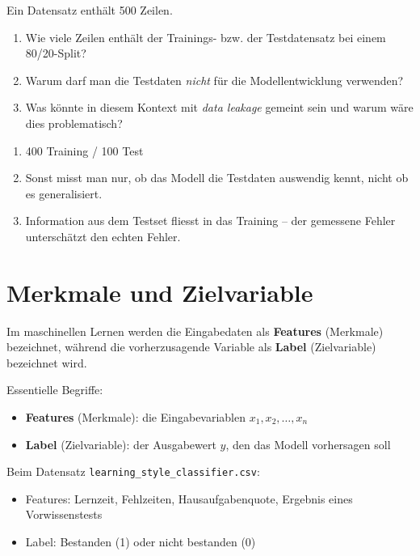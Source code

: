 \begin{myexercise}
    Ein Datensatz enthält 500 Zeilen.
    \begin{enumerate}
        \item Wie viele Zeilen enthält der Trainings- bzw. der Testdatensatz bei einem 80/20-Split?
        \item Warum darf man die Testdaten \emph{nicht} für die Modellentwicklung verwenden?
        \item Was könnte in diesem Kontext mit \emph{data leakage} gemeint sein und warum wäre dies problematisch?
    \end{enumerate}
    \begin{myanswer}
        \begin{enumerate}
            \item 400 Training / 100 Test \quad
            \item Sonst misst man nur, ob das Modell die Testdaten auswendig kennt, nicht ob es generalisiert. \quad
            \item Information aus dem Testset fliesst in das Training -- der gemessene Fehler unterschätzt den echten Fehler.
        \end{enumerate}
    \end{myanswer}
\end{myexercise}

\section{Merkmale und Zielvariable}
Im maschinellen Lernen werden die Eingabedaten als \textbf{Features} (Merkmale) bezeichnet, während die vorherzusagende Variable als \textbf{Label} (Zielvariable) bezeichnet wird.
\begin{mydefinition}
    Essentielle Begriffe:
    \begin{itemize}
        \item \textbf{Features} (Merkmale): die Eingabevariablen $x_1, x_2, \ldots, x_n$
        \item \textbf{Label} (Zielvariable): der Ausgabewert $y$, den das Modell vorhersagen soll
    \end{itemize}
\end{mydefinition}

\begin{myexample}
    Beim Datensatz \texttt{learning\_style\_classifier.csv}:
    \begin{itemize}
        \item Features: Lernzeit, Fehlzeiten, Hausaufgabenquote, Ergebnis eines Vorwissenstests
        \item Label: Bestanden (1) oder nicht bestanden (0)
    \end{itemize}
\end{myexample}

